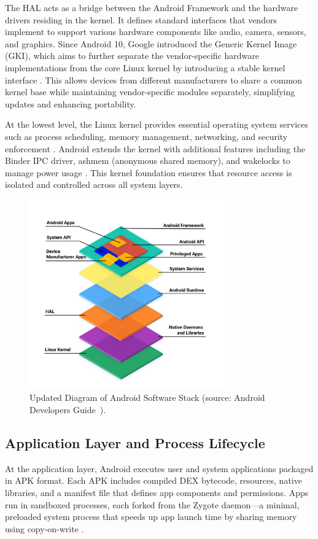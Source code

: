 \documentclass[a4paper,12pt]{report}
\begin{document}
The HAL acts as a bridge between the Android Framework and the hardware drivers residing in the kernel. It defines standard interfaces that vendors implement to support various hardware components like audio, camera, sensors, and graphics. Since Android 10, Google introduced the Generic Kernel Image (GKI), which aims to further separate the vendor-specific hardware implementations from the core Linux kernel by introducing a stable kernel interface \cite{AOSPGKI}. This allows devices from different manufacturers to share a common kernel base while maintaining vendor-specific modules separately, simplifying updates and enhancing portability.

At the lowest level, the Linux kernel provides essential operating system services such as process scheduling, memory management, networking, and security enforcement \cite{love2010linux}. Android extends the kernel with additional features including the Binder IPC driver, ashmem (anonymous shared memory), and wakelocks to manage power usage \cite{feng2020survey}. This kernel foundation ensures that resource access is isolated and controlled across all system layers.

\begin{figure}[H]
    \centering
    \includegraphics[width=0.75\textwidth]{android_stack_diagram.png}
    \caption{Updated Diagram of Android Software Stack (source: Android Developers Guide~\cite{AOSPArchOverview}).}
    \label{fig:android_stack}
\end{figure}

\subsection{Application Layer and Process Lifecycle}
At the application layer, Android executes user and system applications packaged in APK format. Each APK includes compiled DEX bytecode, resources, native libraries, and a manifest file that defines app components and permissions. Apps run in sandboxed processes, each forked from the Zygote daemon—a minimal, preloaded system process that speeds up app launch time by sharing memory using copy-on-write \cite{AOSPArchOverview}.
\end{document}
